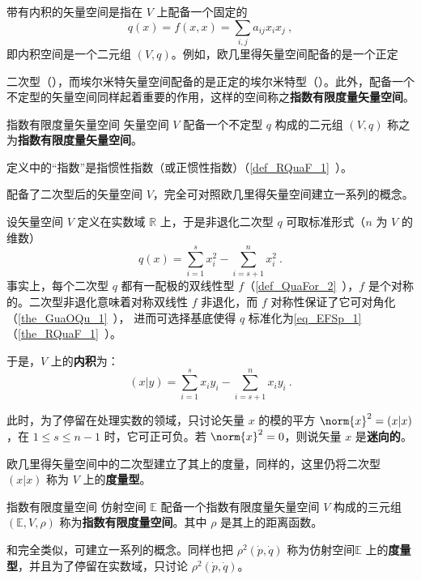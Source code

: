 
\begin{issues}
\issueDraft
\end{issues}

带有内积的矢量空间是指在 $V$ 上配备一个固定的
\begin{equation}
q(x)=f(x,x)=\sum_{i,j}a_{ij}x_ix_j~,
\end{equation}
 即内积空间是一个二元组 $(V,q)$。例如，欧几里得矢量空间配备的是一个正定{二次型（），而埃尔米特矢量空间配备的是正定的埃尔米特型（）。此外，配备一个不定型的矢量空间同样起着重要的作用，这样的空间称之\textbf{指数有限度量矢量空间}。

 \begin{definition}{指数有限度量矢量空间}
 矢量空间 $V$ 配备一个不定型 $q$ 构成的二元组 $(V,q)$ 称之为\textbf{指数有限度量矢量空间}。
 \end{definition}
定义中的“指数”是指惯性指数（或正惯性指数）（\autoref{def_RQuaF_1}~）。

配备了二次型后的矢量空间 $V$，完全可对照欧几里得矢量空间建立一系列的概念。

设矢量空间 $V$ 定义在实数域 $\mathbb R$ 上，于是非退化二次型 $q$ 可取标准形式（$n$ 为 $V$ 的维数）
\begin{equation}\label{eq_EFSp_1}
q(x)=\sum_{i=1}^s x_i^2-\sum_{i=s+1}^n x_i^2~.
\end{equation}
事实上，每个二次型 $q$ 都有一配极的双线性型 $f$（\autoref{def_QuaFor_2}~），$f$ 是个对称的。二次型非退化意味着对称双线性 $f$ 非退化，而 $f$ 对称性保证了它可对角化（\autoref{the_GuaOQu_1}~）， 进而可选择基底使得 $q$ 标准化为\autoref{eq_EFSp_1} （\autoref{the_RQuaF_1}~）。

于是，$V$ 上的\textbf{内积}为：
\begin{equation}
(x|y)=\sum_{i=1}^{s}x_iy_i-\sum_{i=s+1}^{n}x_{i}y_i~.
\end{equation}

此时，为了停留在处理实数的领域，只讨论矢量 $x$ 的模的平方 $\norm{x}^2=(x|x)$，在 $1\leq s\leq n-1$ 时，它可正可负。若 $\norm{x}^2=0$，则说矢量 $x$ 是\textbf{迷向的}。

欧几里得矢量空间中的二次型建立了其上的度量，同样的，这里仍将二次型 $(x|x)$ 称为 $V$ 上的\textbf{度量型}。
\begin{definition}{指数有限度量空间}
 仿射空间 $\mathbb E$ 配备一个指数有限度量矢量空间 $V$ 构成的三元组 $(\mathbb E,V,\rho)$ 称为\textbf{指数有限度量空间}。其中 $\rho$ 是其上的距离函数。
 \end{definition}
 和完全类似，可建立一系列的概念。同样也把 $\rho^2(\dot p,\dot q)$ 称为仿射空间$\mathbb E$ 上的\textbf{度量型}，并且为了停留在实数域，只讨论 $\rho^2(\dot p,\dot q)$。

}
